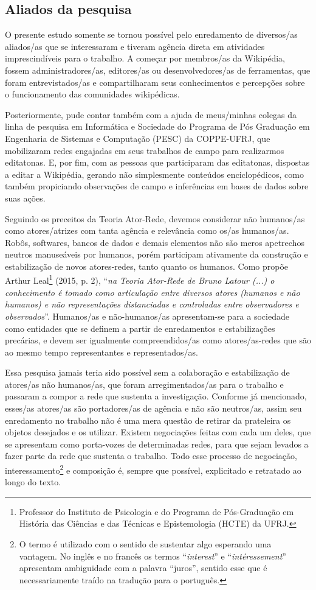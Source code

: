 \subsection{Aliados da pesquisa}

O presente estudo somente se tornou possível pelo enredamento de diversos/as aliados/as que se interessaram e tiveram agência direta em atividades imprescindíveis para o trabalho. A começar por membros/as da Wikipédia, fossem administradores/as, editores/as ou desenvolvedores/as de ferramentas, que foram entrevistados/as e compartilharam seus conhecimentos e percepções sobre o funcionamento das comunidades wikipédicas.

Posteriormente, pude contar também com a ajuda de meus/minhas colegas da linha de pesquisa em Informática e Sociedade do Programa de Pós Graduação em Engenharia de Sistemas e Computação (PESC) da COPPE-UFRJ, que mobilizaram redes engajadas em seus trabalhos de campo para realizarmos editatonas. E, por fim, com as pessoas que participaram das editatonas, dispostas a editar a Wikipédia, gerando não simplesmente conteúdos enciclopédicos, como também propiciando observações de campo e inferências em bases de dados sobre suas ações.

Seguindo os preceitos da Teoria Ator-Rede, devemos considerar não humanos/as como atores/atrizes com tanta agência e relevância como os/as humanos/as. Robôs, softwares, bancos de dados e demais elementos não são meros apetrechos neutros manuseáveis por humanos, porém participam ativamente da construção e estabilização de novos atores-redes, tanto quanto os humanos. Como propõe Arthur Leal\footnote{Professor do Instituto de Psicologia e do Programa de Pós-Graduação em História das Ciências e das Técnicas e Epistemologia (HCTE) da UFRJ.} (2015, p. 2), ``\textit{na Teoria Ator-Rede de Bruno Latour (...) o conhecimento é tomado como articulação entre diversos atores (humanos e não humanos) e não representações distanciadas e controladas entre observadores e observados}''. Humanos/as e não-humanos/as apresentam-se para a sociedade como entidades que se definem a partir de enredamentos e estabilizações precárias, e devem ser igualmente compreendidos/as como atores/as-redes que são ao mesmo tempo representantes e representados/as.

Essa pesquisa jamais teria sido possível sem a colaboração e estabilização de atores/as não humanos/as, que foram arregimentados/as para o trabalho e passaram a compor a rede que sustenta a investigação. Conforme já mencionado, esses/as atores/as são portadores/as de agência e não são neutros/as, assim seu enredamento no trabalho não é uma mera questão de retirar da prateleira os objetos desejados e os utilizar. Existem negociações feitas com cada um deles, que se apresentam como porta-vozes de determinadas redes, para que sejam levados a fazer parte da rede que sustenta o trabalho. Todo esse processo de negociação, interessamento\footnote{O termo é utilizado com o sentido de sustentar algo esperando uma vantagem. No inglês e no francês os termos “\textit{interest}” e “\textit{intéressement}” apresentam ambiguidade com a palavra “juros”, sentido esse que é necessariamente traído na tradução para o português.} e composição é, sempre que possível, explicitado e retratado ao longo do texto.

